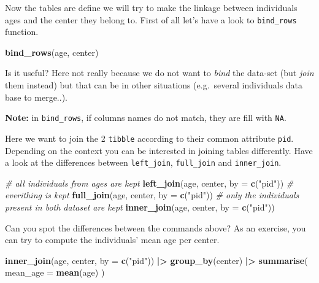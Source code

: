 \documentclass[
]{book}
\newenvironment{Shaded}{\begin{snugshade}}{\end{snugshade}}
\newcommand{\AttributeTok}[1]{\textcolor[rgb]{0.13,0.29,0.53}{#1}}
\newcommand{\CommentTok}[1]{\textcolor[rgb]{0.56,0.35,0.01}{\textit{#1}}}
\newcommand{\FunctionTok}[1]{\textcolor[rgb]{0.13,0.29,0.53}{\textbf{#1}}}
\newcommand{\NormalTok}[1]{#1}
\newcommand{\SpecialCharTok}[1]{\textcolor[rgb]{0.81,0.36,0.00}{\textbf{#1}}}
\newcommand{\StringTok}[1]{\textcolor[rgb]{0.31,0.60,0.02}{#1}}
\begin{document}
Now the tables are define we will try to make the linkage between individuals ages and the center
they belong to.
First of all let's have a look to \texttt{bind\_rows} function.

\begin{Shaded}
\begin{Highlighting}[]
\FunctionTok{bind\_rows}\NormalTok{(age, center)}
\end{Highlighting}
\end{Shaded}

Is it useful?
Here not really because we do not want to \emph{bind} the data-set (but \emph{join} them instead) but that can be in other situations (e.g.~several individuals data base to merge..).

\textbf{Note:} in \texttt{bind\_rows}, if columns names do not match, they are fill with \texttt{NA}.

Here we want to join the 2 \texttt{tibble} according to their common attribute \texttt{pid}. Depending
on the context you can be interested in joining tables differently. Have a look at the differences
between \texttt{left\_join}, \texttt{full\_join} and \texttt{inner\_join}.

\begin{Shaded}
\begin{Highlighting}[]
\CommentTok{\# all individuals from ages are kept}
\FunctionTok{left\_join}\NormalTok{(age, center, }\AttributeTok{by =} \FunctionTok{c}\NormalTok{(}\StringTok{"pid"}\NormalTok{))}
\CommentTok{\# everithing is kept}
\FunctionTok{full\_join}\NormalTok{(age, center, }\AttributeTok{by =} \FunctionTok{c}\NormalTok{(}\StringTok{"pid"}\NormalTok{))}
\CommentTok{\# only the individuals present in both dataset are kept}
\FunctionTok{inner\_join}\NormalTok{(age, center, }\AttributeTok{by =} \FunctionTok{c}\NormalTok{(}\StringTok{"pid"}\NormalTok{))}
\end{Highlighting}
\end{Shaded}

Can you spot the differences between the commands above?
As an exercise, you can try to compute the individuals' mean age per center.

\begin{Shaded}
\begin{Highlighting}[]
\FunctionTok{inner\_join}\NormalTok{(age, center, }\AttributeTok{by =} \FunctionTok{c}\NormalTok{(}\StringTok{"pid"}\NormalTok{)) }\SpecialCharTok{|\textgreater{}}
  \FunctionTok{group\_by}\NormalTok{(center) }\SpecialCharTok{|\textgreater{}}
  \FunctionTok{summarise}\NormalTok{(}
    \AttributeTok{mean\_age =} \FunctionTok{mean}\NormalTok{(age)}
\NormalTok{  )}
\end{Highlighting}
\end{Shaded}
\end{document}
